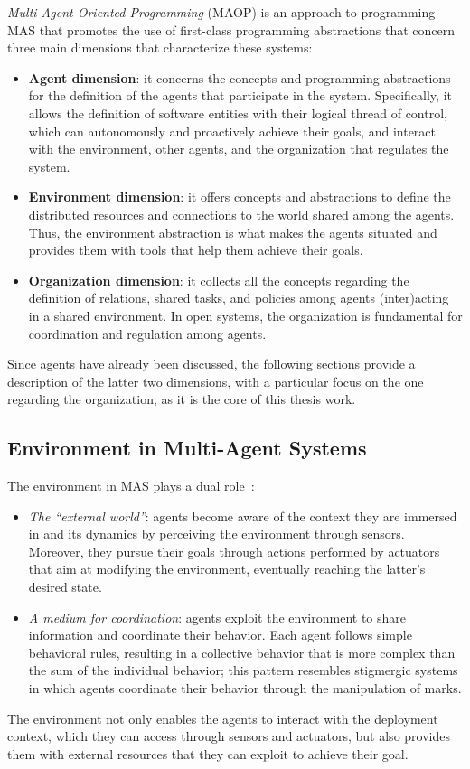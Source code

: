 \textit{Multi-Agent Oriented Programming} (MAOP) is an approach to programming MAS that promotes the use of first-class programming abstractions that concern three main dimensions that characterize these systems:~\cite{boissier2020multi}
\begin{itemize}
    \item \textbf{Agent dimension}: it concerns the concepts and programming abstractions for the definition of the agents that participate in the system.
    Specifically, it allows the definition of software entities with their logical thread of control, which can autonomously and proactively achieve their goals, and interact with the environment, other agents, and the organization that regulates the system.
    \item \textbf{Environment dimension}: it offers concepts and abstractions to define the distributed resources and connections to the world shared among the agents.
    Thus, the environment abstraction is what makes the agents situated and provides them with tools that help them achieve their goals.
    \item \textbf{Organization dimension}: it collects all the concepts regarding the definition of relations, shared tasks, and policies among agents (inter)acting in a shared environment.
    In open systems, the organization is fundamental for coordination and regulation among agents.
\end{itemize}

Since agents have already been discussed, the following sections provide a description of the latter two dimensions, with a particular focus on the one regarding the organization, as it is the core of this thesis work.

\subsection{Environment in Multi-Agent Systems}
The environment in MAS plays a dual role~\cite{weyns2007environment}:
\begin{itemize}
    \item \textit{The ``external world''}:
    agents become aware of the context they are immersed in and its dynamics by perceiving the environment through sensors.
    Moreover, they pursue their goals through actions performed by actuators that aim at modifying the environment, eventually reaching the latter's desired state.
    \item \textit{A medium for coordination}:
    agents exploit the environment to share information and coordinate their behavior.
    Each agent follows simple behavioral rules, resulting in a collective behavior that is more complex than the sum of the individual behavior; this pattern resembles stigmergic systems in which agents coordinate their behavior through the manipulation of marks.
\end{itemize}
The environment not only enables the agents to interact with the deployment context, which they can access through sensors and actuators, but also provides them with external resources that they can exploit to achieve their goal.

